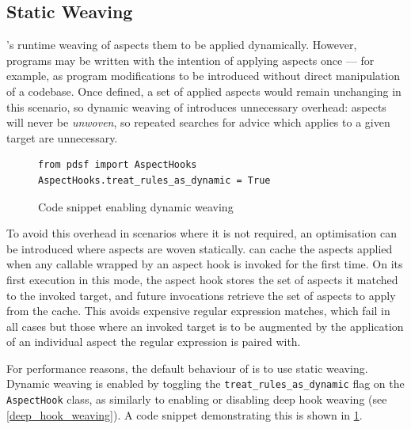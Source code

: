 \subsection{Static Weaving}
\label{static_weaving}

\pdsfthree{}'s runtime weaving of aspects them to be applied dynamically. However,
programs may be written with the intention of applying aspects once --- for
example, as program modifications to be introduced without direct manipulation
of a codebase. Once defined, a set of applied aspects would remain unchanging in
this scenario, so dynamic weaving of \pdsfthree introduces unnecessary overhead:
aspects will never be \emph{unwoven}, so repeated searches for advice which
applies to a given target are unnecessary. 

\begin{figure}[h]
    \begin{lstlisting}[style=footnotesize_python]
from pdsf import AspectHooks
AspectHooks.treat_rules_as_dynamic = True
    \end{lstlisting}
    \caption{Code snippet enabling dynamic weaving}
    \label{fig:enabling_dynamic_weaving}
\end{figure}

To avoid this overhead in scenarios where it is not required, an optimisation
can be introduced where aspects are woven statically. \pdsfthree can cache the
aspects applied when any callable wrapped by an aspect hook is invoked for the
first time. On its first execution in this mode, the aspect hook stores the set
of aspects it matched to the invoked target, and future invocations retrieve the
set of aspects to apply from the cache. This avoids expensive regular expression
matches,
which fail in all cases but those where an invoked target is to be augmented by
the application of an individual aspect the regular expression is paired
with.

For performance reasons, the default behaviour of \pdsfthree is to use static
weaving. Dynamic weaving is enabled by toggling the
\lstinline{treat_rules_as_dynamic} flag on the \lstinline{AspectHook} class, as
similarly to enabling or disabling deep hook weaving (see
\cref{deep_hook_weaving}). A code snippet demonstrating this is shown in
\cref{fig:enabling_dynamic_weaving}.

